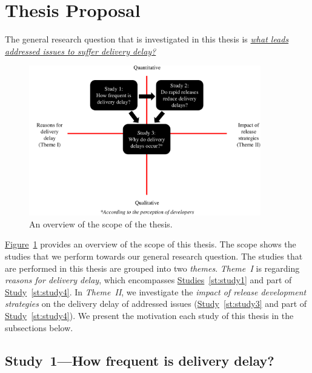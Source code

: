 \section{Thesis Proposal} \label{sec:thesis_overview}

\begin{sloppypar}
The general research question that is investigated in this thesis is {\em
\underline{what leads addressed issues to suffer delivery delay?}}
\end{sloppypar}

\begin{figure}[t]
	\centering
	\includegraphics[width=0.90\textwidth,keepaspectratio]
	{chapters/chapter1/figures/thesis_overview.pdf}
	\caption{An overview of the scope of the thesis.}
	\label{fig:thesis_overview}
\end{figure}

\hyperref[fig:thesis_overview]{Figure}~\ref{fig:thesis_overview} provides an
overview of the scope of this thesis. The scope shows the studies that we
perform towards our general research question. The studies that are performed in
this thesis are grouped into two {\em themes}. {\em
Theme~I} is regarding {\em reasons for delivery delay},
which encompasses \hyperref[st:study1]{Studies}~\ref{st:study1} and part of
\hyperref[st:study4]{Study}~\ref{st:study4}. In {\em
Theme~II}, we investigate the {\em impact of release
development strategies} on the delivery delay of addressed issues
(\hyperref[st:study3]{Study}~\ref{st:study3} and part of
\hyperref[st:study4]{Study}~\ref{st:study4}). We present the motivation \DIFdelbegin {}\DIFdelend \DIFaddbegin {}\DIFaddend each study of this thesis in the subsections below.

\subsection{Study~1---How frequent is delivery delay?}

